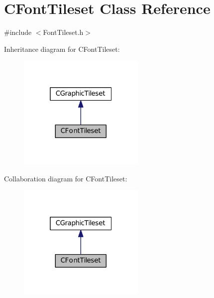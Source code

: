\hypertarget{classCFontTileset}{}\section{C\+Font\+Tileset Class Reference}
\label{classCFontTileset}


{\ttfamily \#include $<$Font\+Tileset.\+h$>$}



Inheritance diagram for C\+Font\+Tileset\+:\nopagebreak
\begin{figure}[H]
\begin{center}
\leavevmode
\includegraphics[width=172pt]{classCFontTileset__inherit__graph}
\end{center}
\end{figure}


Collaboration diagram for C\+Font\+Tileset\+:\nopagebreak
\begin{figure}[H]
\begin{center}
\leavevmode
\includegraphics[width=172pt]{classCFontTileset__coll__graph}
\end{center}
\end{figure}
